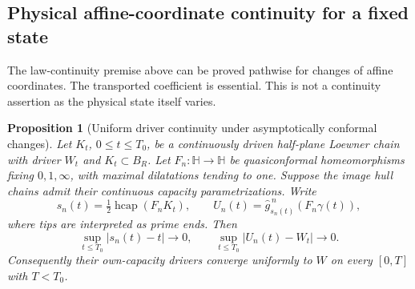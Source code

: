 \documentclass[11pt]{article}
\newtheorem{proposition}[theorem]{Proposition}
\theoremstyle{definition}\newtheorem{definition}[theorem]{Definition}
\theoremstyle{remark}\newtheorem{remark}[theorem]{Remark}
\begin{document}
\subsection{Physical affine-coordinate continuity for a fixed state}

The law-continuity premise above can be proved pathwise for changes
of affine coordinates. The transported coefficient is essential.
This is not a continuity assertion as the physical state itself varies.

\begin{proposition}[Uniform driver continuity under asymptotically conformal changes]
\label{prop:qc-coordinate-driver-continuity}
Let $K_t$, $0\le t\le T_0$, be a continuously driven half-plane
Loewner chain with driver $W_t$ and $K_t\subset B_R$. Let
$F_n:\mathbb H\to\mathbb H$ be quasiconformal homeomorphisms fixing
$0,1,\infty$, with maximal dilatations tending to one. Suppose the
image hull chains admit their continuous capacity parametrizations.
Write
\[
 s_n(t)=\tfrac12\operatorname{hcap}(F_nK_t),\qquad
 U_n(t)=\widehat g^{\,n}_{s_n(t)}(F_n\gamma(t)),
\]
where tips are interpreted as prime ends. Then
\[
 \sup_{t\le T_0}|s_n(t)-t|\longrightarrow0,\qquad
 \sup_{t\le T_0}|U_n(t)-W_t|\longrightarrow0.
 \tag{FS6}
\]
Consequently their own-capacity drivers converge uniformly to $W$
on every $[0,T]$ with $T<T_0$.
\end{proposition}
\end{document}
